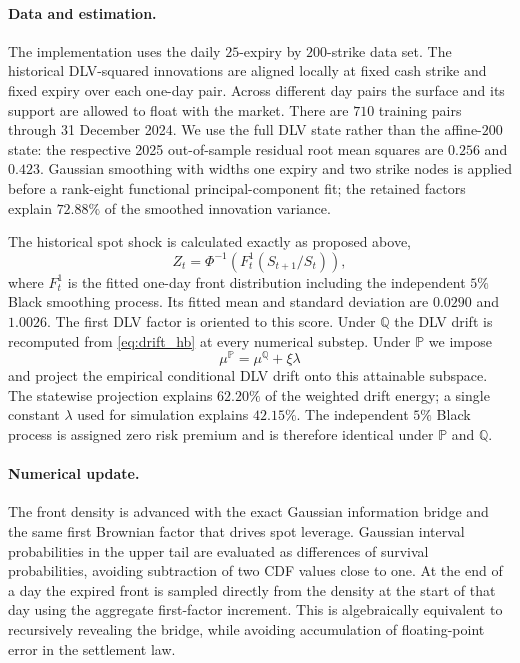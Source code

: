 \documentclass[11pt]{article}
\newcommand{\Q}{\mathbb Q}
\newcommand{\PP}{\mathbb P}
\theoremstyle{plain}
\theoremstyle{definition}
\theoremstyle{remark}
\begin{document}
\paragraph{Data and estimation.}
The implementation uses the daily $25$-expiry by $200$-strike data set.  The
historical DLV-squared innovations are aligned locally at fixed cash strike and
fixed expiry over each one-day pair.  Across different day pairs the surface
and its support are allowed to float with the market.  There are $710$ training
pairs through 31 December 2024.  We use the full DLV state rather than the
affine-$200$ state: the respective 2025 out-of-sample residual root mean
squares are $0.256$ and $0.423$.  Gaussian smoothing with widths one expiry and
two strike nodes is applied before a rank-eight functional principal-component
fit; the retained factors explain $72.88\%$ of the smoothed innovation
variance.

The historical spot shock is calculated exactly as proposed above,
\[
  Z_t=\Phi^{-1}\!\left(F_t^1(S_{t+1}/S_t)\right),
\]
where $F_t^1$ is the fitted one-day front distribution including the independent
$5\%$ Black smoothing process.  Its fitted mean and standard deviation are
$0.0290$ and $1.0026$.  The first DLV factor is oriented to this score.  Under
$\Q$ the DLV drift is recomputed from \eqref{eq:drift_hb} at every numerical
substep.  Under $\PP$ we impose
\[
  \mu^{\PP}=\mu^{\Q}+\xi\lambda
\]
and project the empirical conditional DLV drift onto this attainable subspace.
The statewise projection explains $62.20\%$ of the weighted drift energy; a
single constant $\lambda$ used for simulation explains $42.15\%$.  The
independent $5\%$ Black process is assigned zero risk premium and is therefore
identical under $\PP$ and $\Q$.

\paragraph{Numerical update.}
The front density is advanced with the exact Gaussian information bridge and
the same first Brownian factor that drives spot leverage.  Gaussian interval
probabilities in the upper tail are evaluated as differences of survival
probabilities, avoiding subtraction of two CDF values close to one.  At the end
of a day the expired front is sampled directly from the density at the start of
that day using the aggregate first-factor increment.  This is algebraically
equivalent to recursively revealing the bridge, while avoiding accumulation of
floating-point error in the settlement law.
\end{document}
